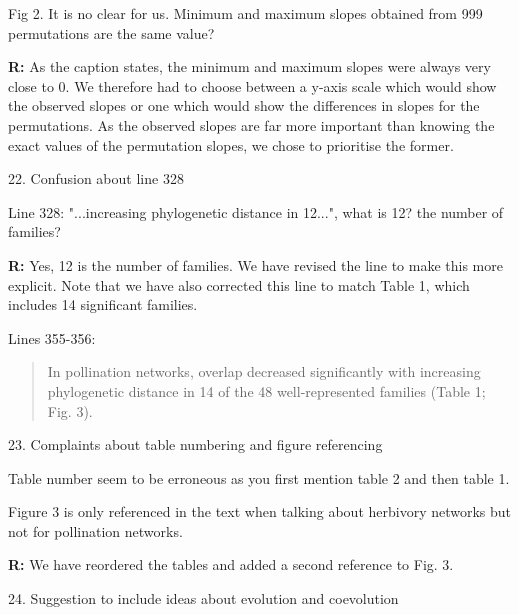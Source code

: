 \documentclass[12pt]{letter}
\newenvironment{refquote}{\bigskip \begin{it}}{\end{it}\smallskip}
\begin{document}
		\begin{refquote}
			Fig 2. It is no clear for us. Minimum and maximum slopes obtained from 999 permutations are the same value?
		\end{refquote}


		\textbf{R:} As the caption states, the minimum and maximum slopes were always very close to 0. We therefore had to choose between a y-axis scale which would show the observed slopes or one which would show the differences in slopes for the permutations. As the observed slopes are far more important than knowing the exact values of the permutation slopes, we chose to prioritise the former.


	22. Confusion about line 328

		\begin{refquote}
			Line  328: "...increasing phylogenetic distance in 12...", what is 12? the number of families?
		\end{refquote}

		\textbf{R:} Yes, 12 is the number of families. We have revised the line to make this more explicit. Note that we have also corrected this line to match Table 1, which includes 14 significant families.


		Lines 355-356: 


		\begin{quotation}

		In pollination networks, overlap decreased significantly with increasing phylogenetic distance in 14 of the 48 well-represented families (Table 1; Fig. 3).

		\end{quotation}


	23. Complaints about table numbering and figure referencing

		\begin{refquote}
			Table number seem to be erroneous as you first mention table 2 and then table 1.

			\smallskip

			Figure 3 is only referenced in the text when talking about herbivory networks but not for pollination networks.
		\end{refquote}

		\textbf{R:} We have reordered the tables and added a second reference to Fig. 3.


	24. Suggestion to include ideas about evolution and coevolution 
\end{document}
